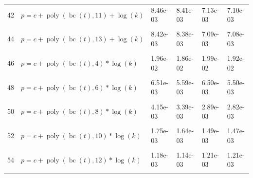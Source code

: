 \documentclass[12pt,a4paper]{article}
\DeclareMathOperator{\bc}{bc}
\DeclareMathOperator{\poly}{poly}
\begin{document}
\begin{longtable}[t]{ll>{\raggedleft\arraybackslash}p{2cm}>{\raggedleft\arraybackslash}p{2cm}>{\raggedleft\arraybackslash}p{2cm}>{\raggedleft\arraybackslash}p{2cm}}
42 & $p = c + \poly\left( \bc(t), 11 \right) + \log(k)$ & 8.46e-03 & 8.41e-03 & 7.13e-03 & 7.10e-03\\
\cellcolor{gray!6}{43} & \cellcolor{gray!6}{$p = c + \poly\left( \bc(t), 12 \right) + \log(k)$} & \cellcolor{gray!6}{8.45e-03} & \cellcolor{gray!6}{8.40e-03} & \cellcolor{gray!6}{7.11e-03} & \cellcolor{gray!6}{7.09e-03}\\
44 & $p = c + \poly\left( \bc(t), 13 \right) + \log(k)$ & 8.42e-03 & 8.38e-03 & 7.09e-03 & 7.08e-03\\
\cellcolor{gray!6}{45} & \cellcolor{gray!6}{$p = c + \poly\left( \bc(t), 3 \right) * \log(k)$} & \cellcolor{gray!6}{3.30e-02} & \cellcolor{gray!6}{2.00e-02} & \cellcolor{gray!6}{2.13e-02} & \cellcolor{gray!6}{1.98e-02}\\
46 & $p = c + \poly\left( \bc(t), 4 \right) * \log(k)$ & 1.96e-02 & 1.86e-02 & 1.99e-02 & 1.92e-02\\
\cellcolor{gray!6}{47} & \cellcolor{gray!6}{$p = c + \poly\left( \bc(t), 5 \right) * \log(k)$} & \cellcolor{gray!6}{1.67e-02} & \cellcolor{gray!6}{1.61e-02} & \cellcolor{gray!6}{1.37e-02} & \cellcolor{gray!6}{1.35e-02}\\
48 & $p = c + \poly\left( \bc(t), 6 \right) * \log(k)$ & 6.51e-03 & 5.59e-03 & 6.50e-03 & 5.50e-03\\
\cellcolor{gray!6}{49} & \cellcolor{gray!6}{$p = c + \poly\left( \bc(t), 7 \right) * \log(k)$} & \cellcolor{gray!6}{5.97e-03} & \cellcolor{gray!6}{4.94e-03} & \cellcolor{gray!6}{4.99e-03} & \cellcolor{gray!6}{4.49e-03}\\
50 & $p = c + \poly\left( \bc(t), 8 \right) * \log(k)$ & 4.15e-03 & 3.39e-03 & 2.89e-03 & 2.82e-03\\
\cellcolor{gray!6}{51} & \cellcolor{gray!6}{$p = c + \poly\left( \bc(t), 9 \right) * \log(k)$} & \cellcolor{gray!6}{2.71e-03} & \cellcolor{gray!6}{2.51e-03} & \cellcolor{gray!6}{2.73e-03} & \cellcolor{gray!6}{2.56e-03}\\
52 & $p = c + \poly\left( \bc(t), 10 \right) * \log(k)$ & 1.75e-03 & 1.64e-03 & 1.49e-03 & 1.47e-03\\
\cellcolor{gray!6}{53} & \cellcolor{gray!6}{$p = c + \poly\left( \bc(t), 11 \right) * \log(k)$} & \cellcolor{gray!6}{1.31e-03} & \cellcolor{gray!6}{1.26e-03} & \cellcolor{gray!6}{1.39e-03} & \cellcolor{gray!6}{1.33e-03}\\
54 & $p = c + \poly\left( \bc(t), 12 \right) * \log(k)$ & 1.18e-03 & 1.14e-03 & 1.21e-03 & 1.21e-03\\
\cellcolor{gray!6}{55} & \cellcolor{gray!6}{$p = c + \poly\left( \bc(t), 13 \right) * \log(k)$} & \cellcolor{gray!6}{1.08e-03} & \cellcolor{gray!6}{1.07e-03} & \cellcolor{gray!6}{1.17e-03} & \cellcolor{gray!6}{1.17e-03}\\

\end{longtable}
\end{document}

